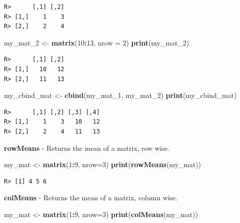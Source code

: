 \documentclass[
  12pt,
]{book}
\newenvironment{Shaded}{\begin{snugshade}}{\end{snugshade}}
\newcommand{\DataTypeTok}[1]{\textcolor[rgb]{0.27,0.27,0.27}{#1}}
\newcommand{\DecValTok}[1]{\textcolor[rgb]{0.06,0.06,0.06}{#1}}
\newcommand{\KeywordTok}[1]{\textcolor[rgb]{0.27,0.27,0.27}{\textbf{#1}}}
\newcommand{\NormalTok}[1]{#1}
\newcommand{\OperatorTok}[1]{\textcolor[rgb]{0.43,0.43,0.43}{\textbf{#1}}}
\newcommand{\StringTok}[1]{\textcolor[rgb]{0.5,0.5,0.5}{#1}}
\begin{document}
\begin{verbatim}
R>      [,1] [,2]
R> [1,]    1    3
R> [2,]    2    4
\end{verbatim}

\begin{Shaded}
\begin{Highlighting}[]
\NormalTok{my_mat_}\DecValTok{2}\NormalTok{ <-}\StringTok{ }\KeywordTok{matrix}\NormalTok{(}\DecValTok{10}\OperatorTok{:}\DecValTok{13}\NormalTok{, }\DataTypeTok{nrow =} \DecValTok{2}\NormalTok{)}
\KeywordTok{print}\NormalTok{(my_mat_}\DecValTok{2}\NormalTok{)}
\end{Highlighting}
\end{Shaded}

\begin{verbatim}
R>      [,1] [,2]
R> [1,]   10   12
R> [2,]   11   13
\end{verbatim}

\begin{Shaded}
\begin{Highlighting}[]
\NormalTok{my_cbind_mat <-}\StringTok{ }\KeywordTok{cbind}\NormalTok{(my_mat_}\DecValTok{1}\NormalTok{, my_mat_}\DecValTok{2}\NormalTok{)}
\KeywordTok{print}\NormalTok{(my_cbind_mat)}
\end{Highlighting}
\end{Shaded}

\begin{verbatim}
R>      [,1] [,2] [,3] [,4]
R> [1,]    1    3   10   12
R> [2,]    2    4   11   13
\end{verbatim}

\textbf{rowMeans} - Returns the mean of a matrix, row wise. 

\begin{Shaded}
\begin{Highlighting}[]
\NormalTok{my_mat <-}\StringTok{ }\KeywordTok{matrix}\NormalTok{(}\DecValTok{1}\OperatorTok{:}\DecValTok{9}\NormalTok{, }\DataTypeTok{nrow=}\DecValTok{3}\NormalTok{)}
\KeywordTok{print}\NormalTok{(}\KeywordTok{rowMeans}\NormalTok{(my_mat))}
\end{Highlighting}
\end{Shaded}

\begin{verbatim}
R> [1] 4 5 6
\end{verbatim}

\textbf{colMeans} - Returns the mean of a matrix, column wise. 

\begin{Shaded}
\begin{Highlighting}[]
\NormalTok{my_mat <-}\StringTok{ }\KeywordTok{matrix}\NormalTok{(}\DecValTok{1}\OperatorTok{:}\DecValTok{9}\NormalTok{, }\DataTypeTok{nrow=}\DecValTok{3}\NormalTok{)}
\KeywordTok{print}\NormalTok{(}\KeywordTok{colMeans}\NormalTok{(my_mat))}
\end{Highlighting}
\end{Shaded}
\end{document}
